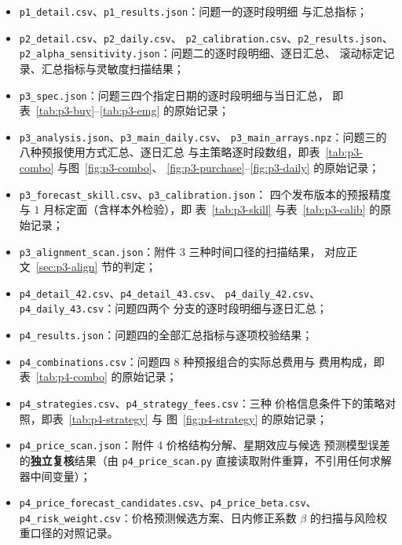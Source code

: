 \documentclass[withoutpreface,bwprint]{cumcmthesis}
\begin{document}
\begin{appendices}
\begin{itemize}
  \item \texttt{p1\_detail.csv}、\texttt{p1\_results.json}：问题一的逐时段明细
        与汇总指标；
  \item \texttt{p2\_detail.csv}、\texttt{p2\_daily.csv}、
        \texttt{p2\_calibration.csv}、\texttt{p2\_results.json}、
        \texttt{p2\_alpha\_sensitivity.json}：问题二的逐时段明细、逐日汇总、
        滚动标定记录、汇总指标与灵敏度扫描结果；
  \item \texttt{p3\_spec.json}：问题三四个指定日期的逐时段明细与当日汇总，
        即表~\ref{tab:p3-buy}--\ref{tab:p3-emg} 的原始记录；
  \item \texttt{p3\_analysis.json}、\texttt{p3\_main\_daily.csv}、
        \texttt{p3\_main\_arrays.npz}：问题三的八种预报使用方式汇总、逐日汇总
        与主策略逐时段数组，即表~\ref{tab:p3-combo} 与图~\ref{fig:p3-combo}、
        \ref{fig:p3-purchase}--\ref{fig:p3-daily} 的原始记录；
  \item \texttt{p3\_forecast\_skill.csv}、\texttt{p3\_calibration.json}：
        四个发布版本的预报精度与 $1$ 月标定面（含样本外检验），即
        表~\ref{tab:p3-skill} 与表~\ref{tab:p3-calib} 的原始记录；
  \item \texttt{p3\_alignment\_scan.json}：附件 3 三种时间口径的扫描结果，
        对应正文~\ref{sec:p3-align} 节的判定；
  \item \texttt{p4\_detail\_42.csv}、\texttt{p4\_detail\_43.csv}、
        \texttt{p4\_daily\_42.csv}、\texttt{p4\_daily\_43.csv}：问题四两个
        分支的逐时段明细与逐日汇总；
  \item \texttt{p4\_results.json}：问题四的全部汇总指标与逐项校验结果；
  \item \texttt{p4\_combinations.csv}：问题四 $8$ 种预报组合的实际总费用与
        费用构成，即表~\ref{tab:p4-combo} 的原始记录；
  \item \texttt{p4\_strategies.csv}、\texttt{p4\_strategy\_fees.csv}：三种
        价格信息条件下的策略对照，即表~\ref{tab:p4-strategy} 与
        图~\ref{fig:p4-strategy} 的原始记录；
  \item \texttt{p4\_price\_scan.json}：附件 4 价格结构分解、星期效应与候选
        预测模型误差的\textbf{独立复核}结果（由 \texttt{p4\_price\_scan.py}
        直接读取附件重算，不引用任何求解器中间变量）；
  \item \texttt{p4\_price\_forecast\_candidates.csv}、\texttt{p4\_price\_beta.csv}、
        \texttt{p4\_risk\_weight.csv}：价格预测候选方案、日内修正系数
        $\beta$ 的扫描与风险权重口径的对照记录。
\end{itemize}




\end{appendices}
\end{document}
